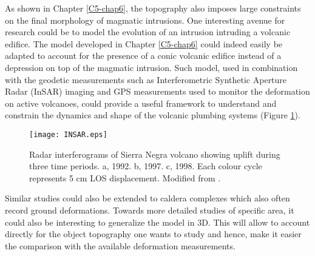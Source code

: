 As shown in Chapter \ref{C5-chap6},  the topography also imposes large
constraints  on  the final  morphology  of  magmatic intrusions.   One
interesting avenue for research could be  to model the evolution of an
intrusion  intruding  a  volcanic  edifice.  The  model  developed  in
Chapter \ref{C5-chap6} could  indeed easily be adapted  to account for
the presence  of a conic volcanic  edifice instead of a  depression on
top of the  magmatic intrusion.  Such model, used  in combination with
the geodetic  measurements such as Interferometric  Synthetic Aperture
Radar  (InSAR)  imaging  and  GPS measurements  used  to  monitor  the
deformation on active  volcanoes, could provide a  useful framework to
understand  and  constrain the  dynamics  and  shape of  the  volcanic
plumbing systems (Figure \ref{C7-Volcano}).
\begin{figure}[h!]
  \begin{center}
    \graphicspath{ {/Users/thorey/Documents/These/Manuscript/Figure/Chapter7/} }
    \texttt{[image: INSAR.eps]}
    \caption{Radar  interferograms  of  Sierra Negra  volcano  showing
      uplift during  three time periods.   a, 1992. b, 1997.  c, 1998.
      Each colour cycle represents 5 cm LOS displacement. Modified
      from \citet{Amelung:2000ko}.}
    \label{C7-Volcano}
  \end{center}
\end{figure}

Similar studies could also be extended to caldera complexes which also
often record  ground deformations.   Towards more detailed  studies of
specific area, it could also be interesting to generalize the model in
$3$D. This  will allow to  account directly for the  object topography
one wants to  study and hence, make it easier  the comparison with the
available deformation measurements.



